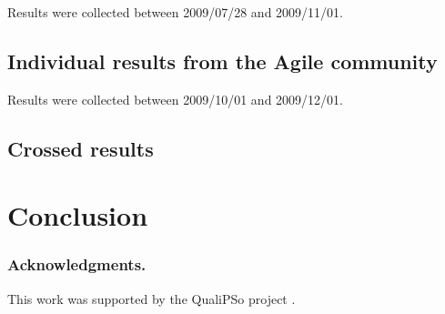 \documentclass[lnbip]{svmultln}
\begin{document}
Results were collected between 2009/07/28 and 2009/11/01.

\subsection{Individual results from the Agile community}
\label{subsec:agile-results}

Results were collected between 2009/10/01 and 2009/12/01.

\subsection{Crossed results}
\label{subsec:crossed-results}

\section{Conclusion}
\label{sec:conclusion}


\subsubsection*{Acknowledgments.}

This work was supported by the QualiPSo project \cite{url:qualipso}.
\end{document}
